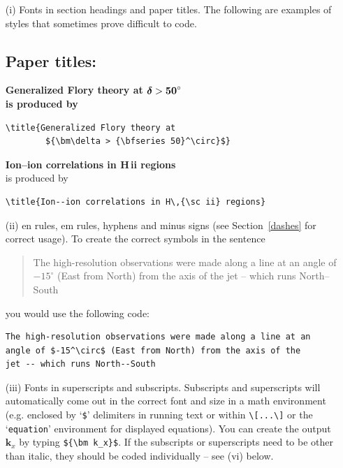 \documentclass{gCOV2e}
\theoremstyle{plain}%
\theoremstyle{definition}
\theoremstyle{remark}
\begin{document}
\begin{enumerate}
\item[(i)] Fonts in section headings and paper titles. The following are examples
of styles that sometimes prove difficult to code.


\subsection*{Paper titles:}

\bf{\noindent Generalized Flory theory at ${\bm\delta >
{\bf 50}^\circ}$}\\

    \noindent\normalfont is produced by
\begin{verbatim}
\title{Generalized Flory theory at
        ${\bm\delta > {\bfseries 50}^\circ}$}
\end{verbatim}
\bigskip

{\bf{\noindent Ion--ion correlations in H\,{\sc ii} regions}}\\

\noindent\normalfont is produced by
\begin{verbatim}
\title{Ion--ion correlations in H\,{\sc ii} regions}
\end{verbatim}



\item[(ii)] en rules, em rules, hyphens and minus signs (see Section~\ref{dashes} for
correct usage). To create the correct symbols in the sentence
\begin{quote}
The high-resolution observations were made along a line at an
angle of $-15^\circ$ (East from North) from the axis of the
jet -- which runs North--South
\end{quote}
you would use the following code:
\begin{verbatim}
The high-resolution observations were made along a line at an
angle of $-15^\circ$ (East from North) from the axis of the
jet -- which runs North--South
\end{verbatim}

\item[(iii)] Fonts in superscripts and subscripts. Subscripts and superscripts will automatically come out in the correct font
and size in a math environment (e.g. enclosed by `\verb"$"'
delimiters in running text or within \verb"\[...\]" or the
`\texttt{equation}' environment for displayed equations). You can create
the output ${\bm k_x}$ by typing \verb"${\bm k_x}$". If the
subscripts or superscripts need to be other than italic, they
should be coded individually -- see (vi) below.


\end{enumerate}
\end{document}
